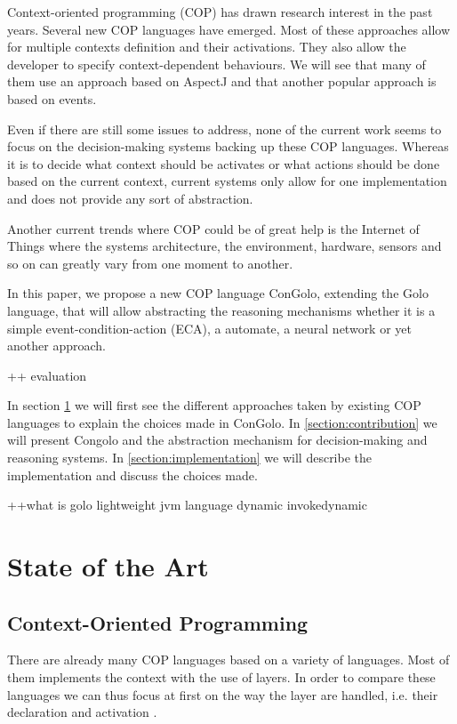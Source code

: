 \documentclass[a4paper]{article}
\begin{document}
Context-oriented programming (COP) has drawn research interest in the past years. Several new COP languages have emerged. Most of these approaches allow for multiple contexts definition and their activations. They also allow the developer to specify context-dependent behaviours. We will see that many of them use an approach based on AspectJ and that another popular approach is based on events.

Even if there are still some issues to address, none of the current work seems to focus on the decision-making systems backing up these COP languages. Whereas it is to decide what context should be activates or what actions should be done based on the current context, current systems only allow for one implementation and does not provide any sort of abstraction.

Another current trends where COP could be of great help is the Internet of Things where the systems architecture, the environment, hardware, sensors and so on can greatly vary from one moment to another.

In this paper, we propose a new COP language ConGolo, extending the Golo language, that will allow abstracting the reasoning mechanisms whether it is a simple event-condition-action (ECA), a automate, a neural network or yet another approach.

++ evaluation

In section \ref{section:stateoftheart} we will first see the different approaches taken by existing COP languages to explain the choices made in ConGolo. In \ref{section:contribution} we will present Congolo and the abstraction mechanism for decision-making and reasoning systems. In \ref{section:implementation} we will describe the implementation and discuss the choices made.


++what is golo \cite{ponge_golo_2013}
lightweight jvm language
dynamic
invokedynamic



\section{State of the Art}
\label{section:stateoftheart}

\subsection{Context-Oriented Programming}


There are already many COP languages based on a variety of languages. Most of them implements the context with the use of layers. In order to compare these languages we can thus focus at first on the way the layer are handled, i.e. their declaration and activation \cite{appeltauer_comparison_2009}.
\end{document}
